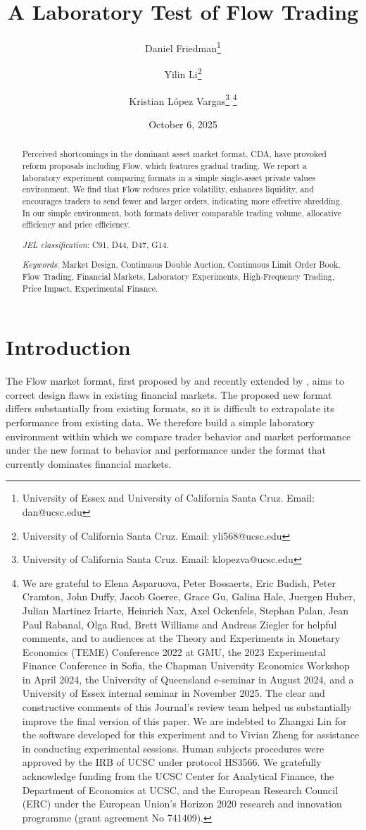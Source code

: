 \documentclass[12pt]{article}
\title{A Laboratory Test of Flow Trading}
\author{
  Daniel Friedman\thanks{
  University of Essex and University of California Santa Cruz. Email: dan@ucsc.edu} 
\and
  Yilin Li\thanks{
  University of California Santa Cruz. Email: yli568@ucsc.edu} 
\and
  Kristian L\'opez Vargas\thanks{
  University of California Santa Cruz. Email: klopezva@ucsc.edu}
  \thanks{
We are grateful to Elena Asparuova, Peter Bossaerts, Eric Budish, Peter Cramton, John Duffy,  Jacob Goeree, Grace Gu, Galina Hale, Juergen Huber, Julian Martinez Iriarte, Heinrich Nax, Axel Ockenfels, Stephan Palan,  Jean Paul Rabanal, Olga Rud, Brett Williams and  Andreas Ziegler
for helpful comments,  
and to audiences at the Theory and Experiments in Monetary Economics (TEME) Conference 2022 at GMU, the 2023 Experimental Finance Conference in Sofia, the Chapman University Economics Workshop in April 2024, the University of Queensland e-seminar in August 2024, and a University of Essex internal seminar in November 2025.
The clear and constructive comments of this Journal's review team helped us substantially improve the final version of this paper.
We are indebted to Zhangxi Lin for the software developed for this experiment and to Vivian Zheng for assistance in conducting experimental sessions. 
Human subjects procedures were approved by the IRB of UCSC under protocol HS3566. 
We gratefully acknowledge funding from the UCSC Center for Analytical Finance, the Department of Economics at UCSC, and the European Research Council (ERC) under the European Union’s Horizon 2020 research and innovation programme (grant agreement No 741409).}
}
\date{October 6, 2025}
\begin{document}
\maketitle

\vspace{-.4in}
\begin{abstract}
\begin{singlespace}
Perceived shortcomings in the dominant asset market format, CDA, have provoked reform proposals including Flow, which features gradual trading. 
We report a laboratory experiment comparing formats in a simple single-asset private values environment. 
We find that Flow reduces price volatility, enhances liquidity, and encourages traders to send fewer and larger orders, indicating more effective shredding. 
In our simple environment, both formats deliver comparable trading volume, allocative efficiency and price efficiency. 

\bigskip

\noindent\textit{JEL classification}: C91, D44, D47, G14.

\noindent \textit{Keywords}: Market Design, Continuous Double Auction, Continuous Limit Order Book, Flow Trading, Financial Markets, Laboratory Experiments, High-Frequency Trading, Price Impact, Experimental Finance.

\end{singlespace}
\end{abstract}




\newpage
\setcounter{page}{1}
\section*{Introduction} \label{introduction}

The Flow market format, first proposed by \cite{Kyle2017} and recently extended by \cite{Budish2023}, aims to 
correct design flaws in existing financial markets. 
The proposed new format differs substantially from existing formats,
so it is difficult to extrapolate its performance from existing data. 
We therefore build a simple laboratory environment within which we compare trader behavior and market performance under the new format to behavior and performance under the format that currently dominates financial markets.
\end{document}
